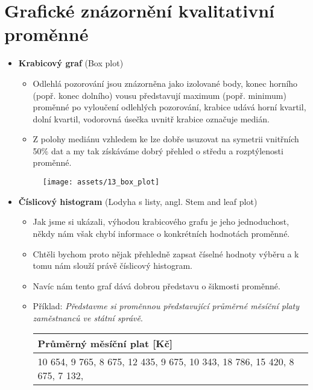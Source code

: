 \section{Grafické znázornění kvalitativní proměnné}
\begin{itemize}
    \item \textbf{Krabicový graf} (Box plot)
          \begin{itemize}
              \item Odlehlá pozorování jsou znázorněna jako izolované body, konec horního (popř. konec dolního) vousu představují maximum (popř. minimum) proměnné po vyloučení odlehlých pozorování, krabice udává horní kvartil,  dolní kvartil, vodorovná úsečka uvnitř krabice označuje medián.
              \item Z polohy mediánu vzhledem ke  lze dobře usuzovat na symetrii vnitřních 50\% dat a my tak získáváme dobrý přehled o středu a rozptýlenosti proměnné.
          \end{itemize}
          \begin{figure}[H]
              \centering
              \texttt{[image: assets/13\_box\_plot]}
          \end{figure}
    \item \textbf{Číslicový histogram} (Lodyha s listy, angl. Stem and leaf plot)
          \begin{itemize}
              \item Jak jsme si ukázali, výhodou krabicového grafu je jeho jednoduchost, někdy nám však chybí informace o konkrétních hodnotách proměnné.
              \item Chtěli bychom proto nějak přehledně zapsat číselné hodnoty výběru a k tomu nám slouží právě číslicový histogram.
              \item Navíc nám tento graf dává dobrou představu o šikmosti proměnné.
              \item Příklad: \textit{Představme si proměnnou představující průměrné měsíční platy zaměstnanců ve státní správě}.
                    \begin{table}[H]
                        \centering
                        \begin{tabular}{|l|}
                            \hline
                            \textbf{Průměrný měsíční plat [Kč]}                                       \\ \hline
                            10 654, 9 765, 8 675, 12 435, 9 675, 10 343, 18 786, 15 420, 8 675,  7 132, \\

\end{tabular}
\end{table}
\end{itemize}
\end{itemize}
